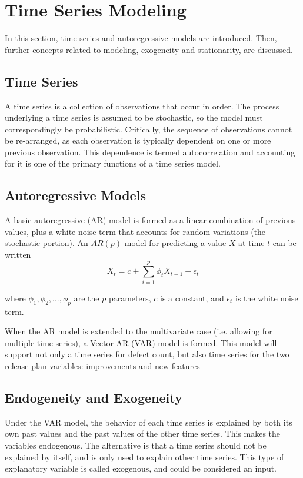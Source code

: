 \documentclass[letterpaper]{report}
\begin{document}
\chapter{Time Series Modeling}
\label{sec:time_series_modeling}
In this section, time series and autoregressive models are introduced. Then, further concepts related to modeling, exogeneity and stationarity, are discussed.

\section*{Time Series}
A time series is a collection of observations that occur in order. The process underlying a time series is assumed to be stochastic, so the model must correspondingly be probabilistic. Critically, the sequence of observations cannot be re-arranged, as each observation is typically dependent on one or more previous observation. This dependence is termed autocorrelation and accounting for it is one of the primary functions of a time series model.

\section*{Autoregressive Models}
A basic autoregressive (AR) model is formed as a linear combination of previous values, plus a white noise term that accounts for random variations (the stochastic portion). An $AR(p)$ model for predicting a value $X$ at time $t$ can be written
\begin{equation}
X_t=c+\sum_{i=1}^{p}{\phi_t X_{t-1}+\epsilon_t}
\end{equation}

where $\phi_1, \phi_2, ..., \phi_p$ are the $p$ parameters, $c$ is a constant, and $\epsilon_t$ is the white noise term.

When the AR model is extended to the multivariate case (i.e. allowing for multiple time series), a Vector AR (VAR) model is formed. This model will support not only a time series for defect count, but also time series for the two release plan variables: improvements and new features

\section*{Endogeneity and Exogeneity}
Under the VAR model, the behavior of each time series is explained by both its own past values and the past values of the other time series. This makes the variables endogenous.
The alternative is that a time series should not be explained by itself, and is only used to explain other time series. This type of explanatory variable is called exogenous, and could be considered an input.
\end{document}
